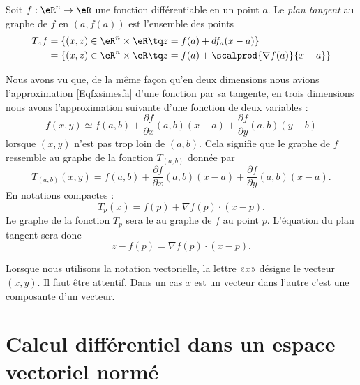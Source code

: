 \begin{definition}
  Soit $f : \eR^n \to\eR$ une fonction différentiable en un point
  $a$. Le \emph{plan tangent} au graphe de $f$ en $(a,f(a))$ est
  l'ensemble des points
  \begin{equation*}
    \begin{split}
      T_af &= \{ (x,z) \in \eR^n \times \eR \tq z = f(a) + d f_a (x-a)\}\\
      &= \{ (x,z) \in \eR^n \times \eR \tq z = f(a) + \scalprod{\nabla f(a)}{x-a}\}
    \end{split}
  \end{equation*}
\end{definition}

Nous avons vu que, de la même façon qu'en deux dimensions nous avions l'approximation \eqref{Eqfxsimesfa} d'une fonction par sa tangente, en trois dimensions nous avons l'approximation suivante d'une fonction de deux variables :
\begin{equation}
    f(x,y)\simeq f(a,b)+\frac{ \partial f }{ \partial x }(a,b)(x-a)+\frac{ \partial f }{ \partial y }(a,b)(y-b)
\end{equation}
lorsque $(x,y)$ n'est pas trop loin de $(a,b)$. Cela signifie que le graphe de $f$ ressemble au graphe de la fonction $T_{(a,b)}$ donnée par
\begin{equation}
    T_{(a,b)}(x,y)=f(a,b)+\frac{ \partial f }{ \partial x }(a,b)(x-a)+\frac{ \partial f }{ \partial y }(a,b)(x-a).
\end{equation}
En notations compactes :
\begin{equation}
    T_p(x)=f(p)+\nabla f(p)\cdot (x-p).
\end{equation}
Le graphe de la fonction $T_p$ sera le  au graphe de $f$ au point $p$. L'équation du plan tangent sera donc
\begin{equation}
    z-f(p)=\nabla f(p)\cdot (x-p).
\end{equation}

\begin{remark}
    Lorsque nous utilisons la notation vectorielle, la lettre «$x$» désigne le vecteur $(x,y)$. Il faut être attentif. Dans un cas $x$ est un vecteur dans l'autre c'est une composante d'un vecteur.
\end{remark}

\section{Calcul différentiel dans un espace vectoriel normé}

